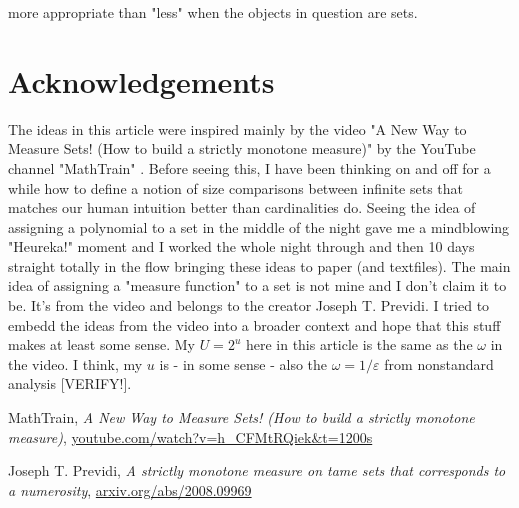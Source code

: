\documentclass[12pt]{article}
\begin{document}
more appropriate than "less" when the objects in question are sets.

\section{Acknowledgements}
The ideas in this article were inspired mainly by the video "A New Way to Measure Sets! (How to build a strictly monotone measure)" by the YouTube channel "MathTrain" \cite{MathTrain1}. Before seeing this, I have been thinking on and off for a while how to define a notion of size comparisons between infinite sets that matches our human intuition better than cardinalities do. Seeing the idea of assigning a polynomial to a set in the middle of the night gave me a mindblowing "Heureka!" moment and I worked the whole night through and then 10 days straight totally in the flow bringing these ideas to paper (and textfiles). The main idea of assigning a "measure function" to a set is not mine and I don't claim it to be. It's from the video and belongs to the creator Joseph T. Previdi. I tried to embedd the ideas from the video into a broader context and hope that this stuff makes at least some sense. My $U = 2^u$ here in this article is the same as the $\omega$ in the video. I think, my $u$ is - in some sense - also the $\omega = 1/\varepsilon$ from nonstandard analysis [VERIFY!].


%

\begin{thebibliography}{9}
MathTrain,
\textit{A New Way to Measure Sets! (How to build a strictly monotone measure)},
\href{https://www.youtube.com/watch?v=h_CFMtRQiek&t=1200s}{youtube.com/watch?v=h\_CFMtRQiek\&t=1200s} 

 Joseph T. Previdi,
 \textit{A strictly monotone measure on tame sets that corresponds to a numerosity},
 \href{https://arxiv.org/abs/2008.09969}{arxiv.org/abs/2008.09969}
\end{thebibliography}
 
\end{document}

